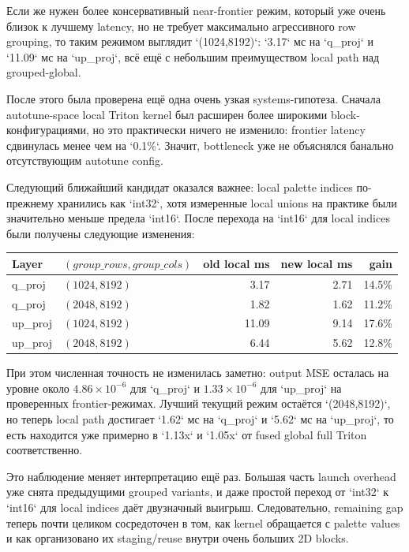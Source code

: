 Если же нужен более консервативный near-frontier режим, который уже очень близок
к лучшему latency, но не требует максимально агрессивного row grouping, то таким
режимом выглядит `(1024,8192)`: `3.17` мс на `q_proj` и `11.09` мс на
`up_proj`, всё ещё с небольшим преимуществом local path над grouped-global.

После этого была проверена ещё одна очень узкая systems-гипотеза. Сначала
autotune-space local Triton kernel был расширен более широкими block-конфигурациями,
но это практически ничего не изменило: frontier latency сдвинулась менее чем на
`0.1\%`. Значит, bottleneck уже не объяснялся банально отсутствующим autotune
config.

Следующий ближайший кандидат оказался важнее: local palette indices по-прежнему
хранились как `int32`, хотя измеренные local unions на практике были значительно
меньше предела `int16`. После перехода на `int16` для local indices были
получены следующие изменения:

\begin{center}
\begin{tabular}{llrrr}
\toprule
Layer & $(group\_rows, group\_cols)$ & old local ms & new local ms & gain \\
\midrule
q\_proj & $(1024, 8192)$ & 3.17 & 2.71 & 14.5\% \\
q\_proj & $(2048, 8192)$ & 1.82 & 1.62 & 11.2\% \\
up\_proj & $(1024, 8192)$ & 11.09 & 9.14 & 17.6\% \\
up\_proj & $(2048, 8192)$ & 6.44 & 5.62 & 12.8\% \\
\bottomrule
\end{tabular}
\end{center}

При этом численная точность не изменилась заметно: output MSE осталась на
уровне около $4.86 \times 10^{-6}$ для `q_proj` и $1.33 \times 10^{-6}$ для
`up_proj` на проверенных frontier-режимах. Лучший текущий режим остаётся
`(2048,8192)`, но теперь local path достигает `1.62` мс на `q_proj` и `5.62`
мс на `up_proj`, то есть находится уже примерно в `1.13x` и `1.05x` от fused
global full Triton соответственно.

Это наблюдение меняет интерпретацию ещё раз. Большая часть launch overhead уже
снята предыдущими grouped variants, и даже простой переход от `int32` к `int16`
для local indices даёт двузначный выигрыш. Следовательно, remaining gap теперь
почти целиком сосредоточен в том, как kernel обращается с palette values и как
организовано их staging/reuse внутри очень больших 2D blocks.


